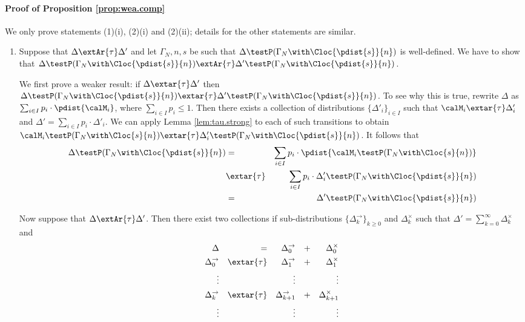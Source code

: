 \documentclass{LMCS}
\begin{document}
\paragraph{\textbf{Proof of Proposition \ref{prop:wea.comp}}}
\label{proof:composition}
We only prove statements (1)(i), (2)(i) and (2)(ii); details for the other statements 
are similar.

\begin{enumerate}
\item Suppose that $\Delta \extAr{\tau} \Delta'$ and let $\Gamma_N, n, s$ be such that 
$\Delta \testP (\Gamma_N \with \Cloc{\pdist{s}}{n})$ is well-defined. We have to show that 
$\Delta \testP (\Gamma_N \with \Cloc{\pdist{s}}{n}) \extAr{\tau} 
\Delta' \testP (\Gamma_N \with \Cloc{\pdist{s}}{n})$. 

We first prove a weaker result: 
if $\Delta \extar{\tau} \Delta'$ then $\Delta \testP (\Gamma_N \with \Cloc{\pdist{s}}{n}) 
\extar{\tau} \Delta' \testP (\Gamma_N \with \Cloc{\pdist{s}}{n})$. 
To see why this is true, rewrite $\Delta$ as 
$\sum_{i \in I} p_i \cdot \pdist{\calM_i}$, where $\sum_{i \in I} p_i \leq 1$. 
Then there exists a collection of distributions $\{\Delta'_i\}_{i \in I}$ such that 
$\calM_i \extar{\tau} \Delta'_i$ and $\Delta' = \sum_{i \in I} p_i \cdot \Delta'_i$. 
We can apply Lemma \ref{lem:tau.strong} to each of such transitions to 
obtain 
$\calM_i \testP (\Gamma_N \with \Cloc{s}{n}) \extar{\tau} \Delta'_i \testP 
(\Gamma_N \with \Cloc{\pdist{s}}{n})$. It follows that 
\begin{eqnarray*}
\Delta \testP (\Gamma_N \with \Cloc{\pdist{s}}{n}) &=& 
\sum_{i \in I} p_i \cdot \pdist{\calM_i \testP (\Gamma_N \with \Cloc{s}{n})}\\ 
&\extar{\tau}& \sum_{i \in I} p_i \cdot \Delta'_i \testP (\Gamma_N \with \Cloc{\pdist{s}}{n})\\
&=& \Delta' \testP (\Gamma_N \with \Cloc{\pdist{s}}{n})
\end{eqnarray*}

Now suppose that $\Delta \extAr{\tau} \Delta'$. Then there exist two collections 
if sub-distributions
$\{\Delta_k^{\rightarrow}\}_{k \geq 0}$ and $\Delta_{k}^{\times}$ such that 
$\Delta' = \sum_{k=0}^{\infty} \Delta_k^{\times}$ and
\begin{align*} 
\Delta &&=&& \Delta_{0}^{\rightarrow} &&+&& \Delta_{0}^{\times}\\
\Delta_0^{\rightarrow} && \extar{\tau} && \Delta_{1}^{\rightarrow} &&+&& 
\Delta_{1}^{\times}\\
\vdots&&&&\vdots&&&&\vdots\\
\Delta_k^{\rightarrow} && \extar{\tau} && \Delta_{k+1}^{\rightarrow} &&+&& 
\Delta_{k+1}^{\times}\\
\vdots&&&&\vdots&&&&\vdots\\
\end{align*}


\end{enumerate}
\end{document}
